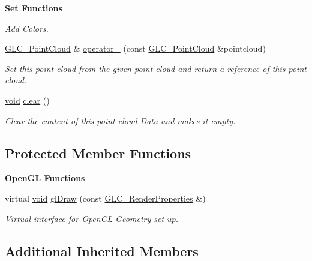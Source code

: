 \begin{Indent}{\bf Set Functions}
\begin{DoxyCompactItemize}
\begin{DoxyCompactList}\small\item\em Add Colors. \end{DoxyCompactList}\item 
\hyperlink{class_g_l_c___point_cloud}{G\-L\-C\-\_\-\-Point\-Cloud} \& \hyperlink{class_g_l_c___point_cloud_a6b66b3361ce9d35f86c8eee0a2815c02}{operator=} (const \hyperlink{class_g_l_c___point_cloud}{G\-L\-C\-\_\-\-Point\-Cloud} \&pointcloud)
\begin{DoxyCompactList}\small\item\em Set this point cloud from the given point cloud and return a reference of this point cloud. \end{DoxyCompactList}\item 
\hyperlink{group___u_a_v_objects_plugin_ga444cf2ff3f0ecbe028adce838d373f5c}{void} \hyperlink{class_g_l_c___point_cloud_a83ec604515e05bc9862c94d65b27dbd7}{clear} ()
\begin{DoxyCompactList}\small\item\em Clear the content of this point cloud Data and makes it empty. \end{DoxyCompactList}\end{DoxyCompactItemize}
\end{Indent}
\subsection*{Protected Member Functions}
\begin{Indent}{\bf Open\-G\-L Functions}\par
\begin{DoxyCompactItemize}
\item 
virtual \hyperlink{group___u_a_v_objects_plugin_ga444cf2ff3f0ecbe028adce838d373f5c}{void} \hyperlink{class_g_l_c___point_cloud_afc223de5c8ddab6ecf0bc9f6ad1cacd3}{gl\-Draw} (const \hyperlink{class_g_l_c___render_properties}{G\-L\-C\-\_\-\-Render\-Properties} \&)
\begin{DoxyCompactList}\small\item\em Virtual interface for Open\-G\-L Geometry set up. \end{DoxyCompactList}\end{DoxyCompactItemize}
\end{Indent}
\subsection*{Additional Inherited Members}


